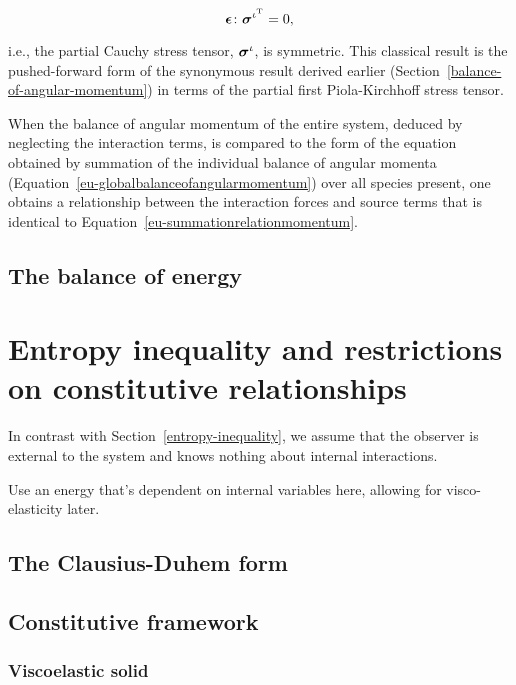 \begin{equation}
\mbox{\boldmath$\epsilon$}\colon\mbox{\boldmath$\sigma$}^{\iota^{\mathrm{T}}} = 0,
\label{eu-localbalanceofangularmomentum}
\end{equation}

\noindent i.e., the partial Cauchy stress tensor, $\mbox{\boldmath$\sigma$}^{\iota}$,
is symmetric. This classical result is the pushed-forward form of
the synonymous result derived earlier
(Section~\ref{balance-of-angular-momentum}) in terms of the partial
first Piola-Kirchhoff stress tensor.

When the balance of angular momentum of the entire system, deduced by
neglecting the interaction terms, is compared to the form of the
equation obtained by summation of the individual balance of angular
momenta (Equation~\ref{eu-globalbalanceofangularmomentum}) over all
species present, one obtains a relationship between the interaction
forces and source terms that is identical to
Equation~\ref{eu-summationrelationmomentum}.

\subsection{The balance of energy}
\label{eu-balance-of-energy}

\section{Entropy inequality and restrictions on constitutive
  relationships}
\label{eu-entropy-inequality}

In contrast with Section~\ref{entropy-inequality}, we assume that the
observer is external to the system and knows nothing about internal
interactions. 

Use an energy that's dependent on internal variables here, allowing for visco-elasticity later.
\subsection{The Clausius-Duhem form}
\subsection{Constitutive framework}
\label{eu-constitutive-framework}
\subsubsection{Viscoelastic solid}
\label{eu-viscoelastic-solid}

